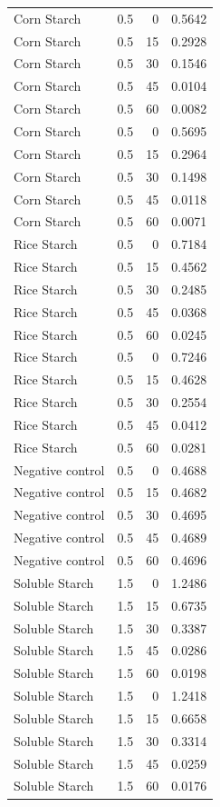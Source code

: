 \documentclass[
  12pt,
]{article}
\begin{document}
{\begin{longtable}[]{@{}lrrr@{}}
Corn Starch & 0.5 & 0 & 0.5642 \\
Corn Starch & 0.5 & 15 & 0.2928 \\
Corn Starch & 0.5 & 30 & 0.1546 \\
Corn Starch & 0.5 & 45 & 0.0104 \\
Corn Starch & 0.5 & 60 & 0.0082 \\
Corn Starch & 0.5 & 0 & 0.5695 \\
Corn Starch & 0.5 & 15 & 0.2964 \\
Corn Starch & 0.5 & 30 & 0.1498 \\
Corn Starch & 0.5 & 45 & 0.0118 \\
Corn Starch & 0.5 & 60 & 0.0071 \\
Rice Starch & 0.5 & 0 & 0.7184 \\
Rice Starch & 0.5 & 15 & 0.4562 \\
Rice Starch & 0.5 & 30 & 0.2485 \\
Rice Starch & 0.5 & 45 & 0.0368 \\
Rice Starch & 0.5 & 60 & 0.0245 \\
Rice Starch & 0.5 & 0 & 0.7246 \\
Rice Starch & 0.5 & 15 & 0.4628 \\
Rice Starch & 0.5 & 30 & 0.2554 \\
Rice Starch & 0.5 & 45 & 0.0412 \\
Rice Starch & 0.5 & 60 & 0.0281 \\
Negative control & 0.5 & 0 & 0.4688 \\
Negative control & 0.5 & 15 & 0.4682 \\
Negative control & 0.5 & 30 & 0.4695 \\
Negative control & 0.5 & 45 & 0.4689 \\
Negative control & 0.5 & 60 & 0.4696 \\
Soluble Starch & 1.5 & 0 & 1.2486 \\
Soluble Starch & 1.5 & 15 & 0.6735 \\
Soluble Starch & 1.5 & 30 & 0.3387 \\
Soluble Starch & 1.5 & 45 & 0.0286 \\
Soluble Starch & 1.5 & 60 & 0.0198 \\
Soluble Starch & 1.5 & 0 & 1.2418 \\
Soluble Starch & 1.5 & 15 & 0.6658 \\
Soluble Starch & 1.5 & 30 & 0.3314 \\
Soluble Starch & 1.5 & 45 & 0.0259 \\
Soluble Starch & 1.5 & 60 & 0.0176 \\

\end{longtable}}
\end{document}
